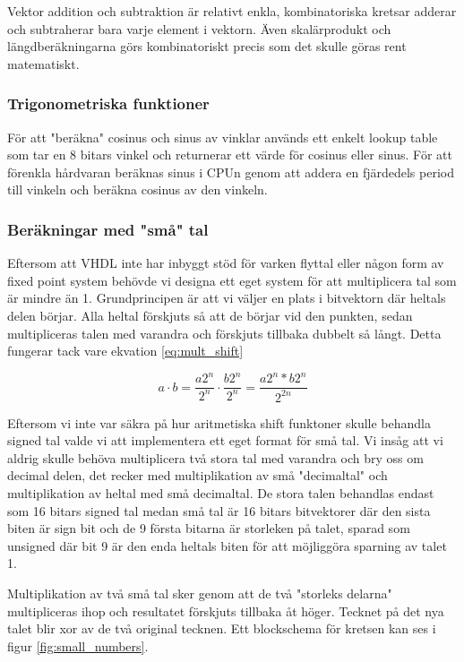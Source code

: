 \documentclass[a4paper]{article}
\begin{document}
    Vektor addition och subtraktion är relativt enkla, kombinatoriska kretsar
    adderar och
    subtraherar bara varje element i vektorn. Även skalärprodukt och
    längdberäkningarna görs kombinatoriskt precis som det skulle göras rent
    matematiskt. 

    \subsubsection{Trigonometriska funktioner}
    För att "beräkna" cosinus och sinus av vinklar används ett enkelt lookup
    table som tar en 8 bitars vinkel och returnerar ett värde för cosinus eller
    sinus. För att förenkla hårdvaran beräknas sinus i CPUn genom att addera en
    fjärdedels period till vinkeln och beräkna cosinus av den vinkeln. 

    \subsubsection{Beräkningar med "små" tal}
    Eftersom att VHDL inte har inbyggt stöd för varken flyttal eller någon form
    av fixed point system behövde vi designa ett eget system för att
    multiplicera tal som är mindre än 1. Grundprincipen är att vi väljer en
    plats i bitvektorn där heltals delen börjar. Alla heltal förskjuts så att de
    börjar vid den punkten, sedan multipliceras talen med varandra och förskjuts
    tillbaka dubbelt så långt. Detta fungerar tack vare ekvation
    \ref{eq:mult_shift}

    \begin{equation}
        \label{eq:mult_shift}
        a \cdot b = \frac{a 2^n}{2^n} \cdot \frac{b 2^n}{2^n} = \frac{a2^n *
        b2^n}{2^{2n}}
    \end{equation}

    Eftersom vi inte var säkra på hur aritmetiska shift funktoner skulle
    behandla signed tal valde vi att implementera ett eget format för små tal.
    Vi insåg att vi aldrig skulle behöva multiplicera två stora tal med varandra
    och bry oss om decimal delen, det recker med multiplikation av små
    "decimaltal" och multiplikation av heltal med små decimaltal. De stora talen
    behandlas endast som 16 bitars signed tal medan små tal är 16 bitars
    bitvektorer där den sista biten är sign bit och de 9 första bitarna är
    storleken på talet, sparad som unsigned där bit 9 är den enda heltals biten
    för att möjliggöra sparning av talet 1. 

    Multiplikation av två små tal sker genom att de två "storleks delarna"
    multipliceras ihop och resultatet förskjuts tillbaka åt höger. Tecknet på
    det nya talet blir xor av de två original tecknen. Ett blockschema för
    kretsen kan ses i figur \ref{fig:small_numbers}.
\end{document}
